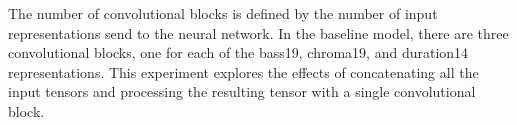 
The number of convolutional blocks is defined by the number
of input representations send to the neural network. In the
baseline model, there are three convolutional blocks, one
for each of the \gls{bass19}, \gls{chroma19}, and
\gls{duration14} representations. This experiment explores
the effects of concatenating all the input tensors and
processing the resulting tensor with a single convolutional
block.

